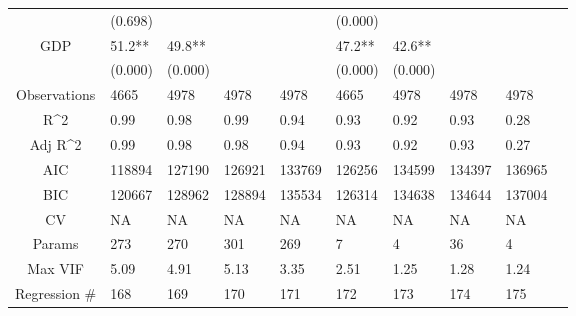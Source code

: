 \documentclass{article}
\begin{document}
\begin{table}[H]
\begin{tabular}{|clllllllll|}
   & (0.698) &  &  &  & (0.000) &  &  &  & \\ 
  GDP & 51.2** & 49.8** &  &  & 47.2** & 42.6** &  &  & \\ 
   & (0.000) & (0.000) &  &  & (0.000) & (0.000) &  &  & \\ 
  \hline 
 Observations & 4665 & 4978 & 4978 & 4978 & 4665 & 4978 & 4978 & 4978 & \\ 
  R^2 & 0.99 & 0.98 & 0.99 & 0.94 & 0.93 & 0.92 & 0.93 & 0.28 & \\ 
  Adj R^2 & 0.99 & 0.98 & 0.98 & 0.94 & 0.93 & 0.92 & 0.93 & 0.27 & \\ 
  AIC & 118894 & 127190 & 126921 & 133769 & 126256 & 134599 & 134397 & 136965 & \\ 
  BIC & 120667 & 128962 & 128894 & 135534 & 126314 & 134638 & 134644 & 137004 & \\ 
  CV & NA & NA & NA & NA & NA & NA & NA & NA & \\ 
  Params & 273 & 270 & 301 & 269 & 7 & 4 & 36 & 4 & \\ 
  Max VIF & 5.09 & 4.91 & 5.13 & 3.35 & 2.51 & 1.25 & 1.28 & 1.24 & \\ 
  Regression \# & 168 & 169 & 170 & 171 & 172 & 173 & 174 & 175 & \\ 
   \hline
\end{tabular}
 
\end{table}
\end{document}
